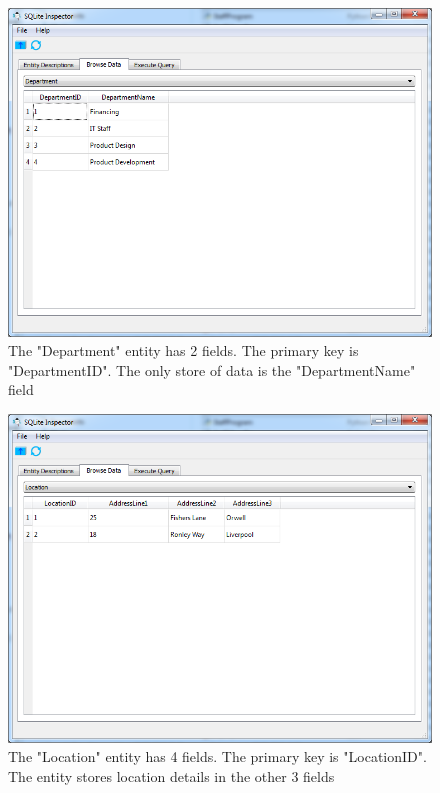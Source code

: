 \begin{figure}[H]
    \includegraphics[width=\textwidth]{./Maintenance/Images/DepartmentTable.png}
    \caption{The "Department" entity has 2 fields. The primary key is "DepartmentID". The only store of data is the "DepartmentName" field} \label{fig:DepartmentTable}
\end{figure}

\begin{figure}[H]
    \includegraphics[width=\textwidth]{./Maintenance/Images/LocationTable.png}
    \caption{The "Location" entity has 4 fields. The primary key is "LocationID". The entity stores location details in the other 3 fields} \label{fig:LocationTable}
\end{figure}

